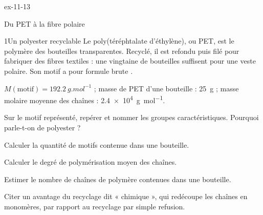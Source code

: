 \begin{blocLivre}{ex-11-13}
\begin{exercice}[3]{Du PET à la fibre polaire}
\begin{docu}{1}{Un polyester recyclable}
Le poly(téréphtalate d'éthylène), ou PET, est le polymère des bouteilles transparentes. Recyclé, il est refondu puis
filé pour fabriquer des fibres textiles : une vingtaine de bouteilles suffisent pour une veste polaire. Son motif a
pour formule brute .
\end{docu}
\begin{donnees}
$M(\text{motif})=\qty{192,2}{g.mol^{-1}}$ ; masse de PET d'une bouteille : 25~g ; masse molaire moyenne des chaînes :
\qty{2,4e4}{g.mol^{-1}}.
\end{donnees}
\begin{questions}
\item Sur le motif représenté, repérer et nommer les groupes caractéristiques. Pourquoi parle-t-on de polyester ?
\item Calculer la quantité de motifs contenue dans une bouteille.
\item Calculer le degré de polymérisation moyen des chaînes.
\item \initiative Estimer le nombre de chaînes de polymère contenues dans une bouteille.
\item Citer un avantage du recyclage dit « chimique », qui redécoupe les chaînes en monomères, par rapport au
recyclage par simple refusion.
\end{questions}
\end{exercice}
\end{blocLivre}
